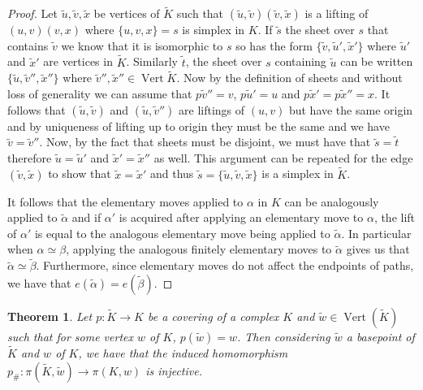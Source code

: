 \documentclass[12pt]{article}
\newtheorem{theorem}{Theorem}
\theoremstyle{definition}
\numberwithin{equation}{theorem}
\begin{document}
\begin{proof}
  Let $\tilde{u},\tilde{v},\tilde{x}$ be vertices of $\tilde{K}$ such that $(\tilde{u},\tilde{v})(\tilde{v},\tilde{x})$ is a lifting of $(u,v)(v,x)$ where $\{u,v,x\} = s$ is  simplex in $K$. If $\tilde{s}$ the sheet over $s$ that contains $\tilde{v}$ we know that it is isomorphic to $s$ so has the form $\{\tilde{v}, \tilde{u}', \tilde{x}' \}$ where $\tilde{u}'$ and $\tilde{x}'$ are vertices in $\tilde{K}$. Similarly $\tilde{t}$, the sheet over $s$ containing $\tilde{u}$ can be written $\{\tilde{u},\tilde{v}'',\tilde{x}''\}$ where $\tilde{v}'',\tilde{x}'' \in \operatorname{Vert}{\tilde{K}}$. Now by the definition of sheets and without loss of generality we can assume that $p\tilde{v}'' = v$, $p\tilde{u}' = u$ and $p\tilde{x}' = p\tilde{x}'' = x$. It follows that $(\tilde{u},\tilde{v})$ and $(\tilde{u},\tilde{v}'')$ are liftings of $(u,v)$ but have the same origin and by uniqueness of lifting up to origin they must be the same and we have $\tilde{v} = \tilde{v}''$. Now, by the fact that sheets must be disjoint, we must have that $\tilde{s} = \tilde{t}$ therefore $\tilde{u} = \tilde{u}'$ and $\tilde{x}' = \tilde{x}''$ as well. This argument can be repeated for the edge $(\tilde{v},\tilde{x})$ to show that $\tilde{x} = \tilde{x}'$ and thus $\tilde{s} = \{\tilde{u},\tilde{v},\tilde{x}\}$ is a simplex in $\tilde{K}$.

  It follows that the elementary moves applied to $\alpha$ in $K$ can be analogously applied to $\tilde{\alpha}$ and if $\alpha'$ is acquired after applying an elementary move to $\alpha$, the lift of $\alpha'$ is equal to the analogous elementary move being applied to $\tilde{\alpha}$. In particular when $\alpha \simeq \beta$, applying the analogous finitely elementary moves to $\tilde{\alpha}$ gives us that $\tilde{\alpha} \simeq \tilde{\beta}$. Furthermore, since elementary moves do not affect the endpoints of paths, we have that $e(\tilde{\alpha}) = e(\tilde{\beta})$.
\end{proof}

\begin{theorem}
  Let $p:\tilde{K} \rightarrow K$ be a covering of a complex $K$ and $\tilde{w} \in \operatorname{Vert}(\tilde{K})$ such that for some vertex $w$ of $K$, $p(\tilde{w}) = w$. Then considering $\tilde{w}$ a basepoint of $\tilde{K}$ and $w$ of $K$, we have that the induced homomorphism $p_{\#} : \pi(\tilde{K},\tilde{w}) \rightarrow \pi(K,w)$ is injective.
\end{theorem}
\end{document}
